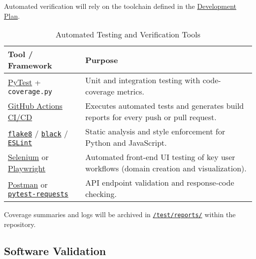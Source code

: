 \documentclass[12pt, titlepage]{article}
\renewcommand{\arraystretch}{1.15}
\begin{document}
Automated verification will rely on the toolchain defined in the \href{https://github.com/thaafei/DomainX/blob/main/docs/DevelopmentPlan/DevelopmentPlan.pdf}{Development
Plan}.

\begin{table}[H]
\centering
\caption{Automated Testing and Verification Tools}
\setlength{\tabcolsep}{6pt}
\renewcommand{\arraystretch}{1.2}
\footnotesize

\begin{tabularx}{\textwidth}{l X}
\toprule
\textbf{Tool / Framework} & \textbf{Purpose} \\
\midrule
\arrayrulecolor[gray]{0.8}
\href{https://docs.pytest.org/en/stable/}{PyTest} + \texttt{coverage.py} &
Unit and integration testing with code-coverage metrics. \\
\hline
\href{https://github.com/thaafei/DomainX/actions}{GitHub Actions CI/CD} &
Executes automated tests and generates build reports for every push or pull
request. \\
\hline
\texttt{\href{https://flake8.pycqa.org/en/latest/}{flake8}} / \texttt{\href{https://github.com/psf/black}{black}} / \texttt{\href{https://eslint.org/}{ESLint}} &
Static analysis and style enforcement for Python and JavaScript. \\
\hline
\href{https://www.selenium.dev/}{Selenium} or \href{https://playwright.dev/}{Playwright} &
Automated front-end UI testing of key user workflows (domain creation and visualization). \\
\hline
\href{https://www.postman.com/}{Postman} or \texttt{\href{https://requests-mock.readthedocs.io/en/latest/pytest.html}{pytest-requests}} &
API endpoint validation and response-code checking. \\
\bottomrule
\end{tabularx}
\end{table}

Coverage summaries and logs will be archived in \texttt{\href{https://github.com/thaafei/DomainX/tree/main/test}{/test/reports/}} within
the repository.

\subsection{Software Validation}
\label{subsec:software-validation}

\end{document}
